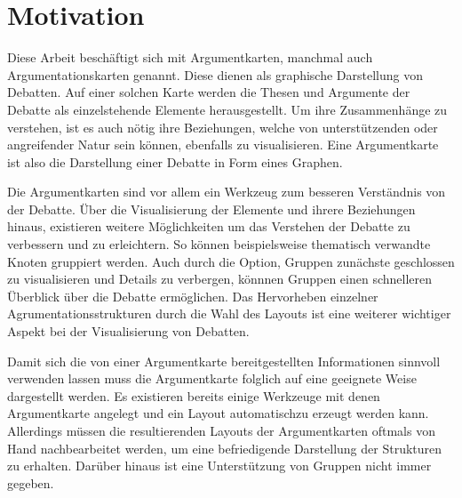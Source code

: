 %

\chapter{Motivation}
Diese Arbeit beschäftigt sich mit Argumentkarten, manchmal auch Argumentationskarten genannt. Diese dienen als graphische Darstellung von Debatten. 
Auf einer solchen Karte werden die Thesen und Argumente der Debatte als einzelstehende Elemente herausgestellt. 
Um ihre Zusammenhänge zu verstehen, ist es auch nötig ihre Beziehungen, welche von unterstützenden oder angreifender Natur sein können, ebenfalls zu visualisieren.
Eine Argumentkarte ist also die Darstellung einer Debatte in Form eines Graphen.


Die Argumentkarten sind vor allem ein Werkzeug zum besseren Verständnis von der Debatte. 
Über die Visualisierung der Elemente und ihrere Beziehungen hinaus, existieren weitere Möglichkeiten um das Verstehen der Debatte zu verbessern und zu erleichtern.
So können beispielsweise thematisch verwandte Knoten gruppiert werden. 
Auch durch die Option, Gruppen zunächste geschlossen zu visualisieren und Details zu verbergen, könnnen Gruppen einen schnelleren Überblick über die Debatte ermöglichen.
Das Hervorheben einzelner Agrumentationsstrukturen durch die Wahl des Layouts ist eine weiterer wichtiger Aspekt bei der Visualisierung von Debatten.

Damit sich die von einer Argumentkarte bereitgestellten Informationen sinnvoll verwenden lassen muss die Argumentkarte folglich auf eine geeignete Weise dargestellt werden.
Es existieren bereits einige Werkzeuge mit denen Argumentkarte angelegt  und ein Layout automatischzu erzeugt werden kann. 
Allerdings müssen die resultierenden Layouts der Argumentkarten oftmals von Hand nachbearbeitet werden, um eine befriedigende Darstellung der Strukturen zu erhalten.
Darüber hinaus ist eine Unterstützung von Gruppen nicht immer gegeben.

